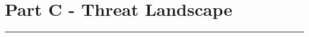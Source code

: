 \section*{Part C - Threat Landscape }

\noindent \begin{center}
\rule[0.5ex]{1\linewidth}{1pt}
\par\end{center}

\begin{comment}

Using the Intel Threat Agent Library ( available on the course page) map out a threat actors and
landscape for TWO of the following scenarios:
    • Ransomware
    • Industrial Espionage
    • Loss of PII via data breach
This should be done for an organisation of your choice and you should provide suitable motivation for
your decisions. You should state any assumptions, and provide suitable context to the case study you
are using.

Expected length 4-6 pages and spreadsheets. (15x2=30)


\end{comment}